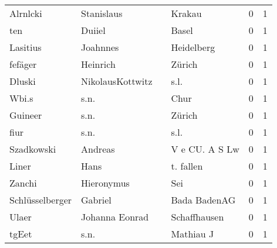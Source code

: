 \documentclass[10pt,a4paper,landscape]{article}
\begin{document}
\begin{longtable}{llllrr}
                 Alrnlcki &                         Stanislaus &             &                                      Krakau &          0 &         1 \\
                      ten &                             Duiiel &             &                                       Basel &          0 &         1 \\
                 Lasitius &                           Joahnnes &             &                                  Heidelberg &          0 &         1 \\
                  fefäger &                           Heinrich &             &                                      Zürich &          0 &         1 \\
                   Dluski &                   NikolausKottwitz &             &                                        s.l. &          0 &         1 \\
                    Wbi.s &                               s.n. &             &                                        Chur &          0 &         1 \\
                  Guineer &                               s.n. &             &                                      Zürich &          0 &         1 \\
                     fiur &                               s.n. &             &                                        s.l. &          0 &         1 \\
               Szadkowski &                            Andreas &             &                              V e CU. A S Lw &          0 &         1 \\
                    Liner &                               Hans &             &                                   t. fallen &          0 &         1 \\
                   Zanchi &                         Hieronymus &             &                                         Sei &          0 &         1 \\
          Schlüsselberger &                            Gabriel &             &                                Bada BadenAG &          0 &         1 \\
                    Ulaer &                     Johanna Eonrad &             &                                Schaffhausen &          0 &         1 \\
                    tgEet &                               s.n. &             &                                   Mathiau J &          0 &         1 \\

\end{longtable}
\end{document}
